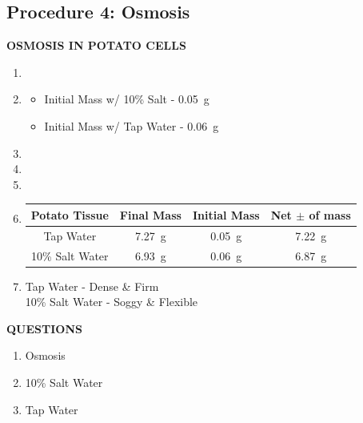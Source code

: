 \documentclass{article}
\begin{document}
\subsection{Procedure 4: Osmosis}
\textbf{OSMOSIS IN POTATO CELLS}
\begin{enumerate}[label=\textbf{\arabic*.}]
	\item
	\item
		\begin{itemize}
			\item Initial Mass w/ 10\% Salt - \SI{0.05}{\gram}
			\item Initial Mass w/ Tap Water - \SI{0.06}{\gram}
		\end{itemize}
	\item
	\item
	\item
	\item
		\begin{tabular}{ c | c | c | c }
			Potato Tissue & Final Mass & Initial Mass & Net $ \pm $ of mass \\
			\hline
			Tap Water & \SI{7.27}{\gram} & \SI{0.05}{\gram} & \SI{7.22}{\gram} \\
			10\% Salt Water & \SI{6.93}{\gram} & \SI{0.06}{\gram} & \SI{6.87}{\gram}
		\end{tabular}
	\item
		Tap Water - Dense \& Firm \\
		10\% Salt Water - Soggy \& Flexible
\end{enumerate}

\textbf{QUESTIONS}
\begin{enumerate}[label=\textbf{\arabic*.}]
	\item
		Osmosis
	\item
		10\% Salt Water
	\item
		Tap Water
\end{enumerate}
\end{document}
